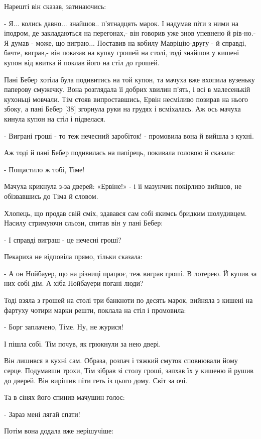 Нарешті він сказав, затинаючись:

- Я... колись давно... знайшов.. п'ятнадцять марок. І надумав піти з ними на іподром, де закладаються на перегонах,- він говорив уже знов упевнено й рів-но.- Я думав - може, що виграю... Поставив на кобилу Мавріцію-другу - й справді, бачте, виграв,- він показав на купку грошей на столі, тоді знайшов у кишені купон від квитка й поклав його на стіл до грошей.

Пані Бебер хотіла була подивитись на той купон, та мачуха вже вхопила вузеньку паперову смужечку. Вона розглядала її добрих хвилин п'ять, і всі в малесенькій кухоньці мовчали. Тім стояв випроставшись, Ервін несміливо позирав на нього збоку, а пані Бебер [38] згорнула руки на грудях і всміхалась. Аж ось мачуха кинула купон на стіл і підвелася.

- Виграні гроші - то теж нечесний заробіток! - промовила вона й вийшла з кухні.

Аж тоді й пані Бебер подивилась на папірець, покивала головою й сказала:

- Пощастило ж тобі, Тіме!

Мачуха крикнула з-за дверей: «Ервіне!» - і її мазунчик покірливо вийшов, не обізвавшись до Тіма й словом.

Хлопець, що продав свій сміх, здавався сам собі якимсь бридким шолудивцем. Насилу стримуючи сльози, спитав він у пані Бебер:

- І справді виграш - це нечесні гроші?

Пекариха не відповіла прямо, тільки сказала:

- А он Нойбауер, що на різниці працює, теж виграв гроші. В лотерею. Й купив за них собі дім. А хіба Нойбауери погані люди?

Тоді взяла з грошей на столі три банкноти по десять марок, вийняла з кишені на фартуху чотири марки решти, поклала на стіл і промовила:

- Борг заплачено, Тіме. Ну, не журися!

І пішла собі. Тім почув, як грюкнули за нею двері.

Він лишився в кухні сам. Образа, розпач і тяжкий смуток сповнювали йому серце. Подумавши трохи, Тім зібрав зі столу гроші, запхав їх у кишеню й рушив до дверей. Він вирішив піти геть із цього дому. Світ за очі.

Та в сінях його спинив мачушин голос:

- Зараз мені лягай спати!

Потім вона додала вже нерішучіше:

